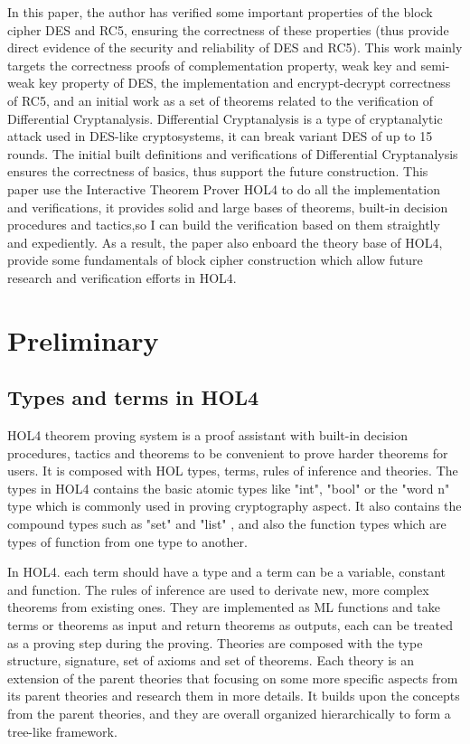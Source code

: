 \documentclass{article}
\begin{document}
In this paper, the author has verified some important properties
of the block cipher DES and RC5, ensuring the correctness of these
properties (thus provide
direct evidence of the security and reliability of DES and RC5).
This work mainly targets the correctness proofs of complementation property,
weak key and semi-weak key property of DES, the implementation and
encrypt-decrypt correctness of RC5, and an initial work as a set of
theorems related to the verification
of Differential Cryptanalysis. Differential Cryptanalysis is a type of cryptanalytic attack used in DES-like
cryptosystems, it can break variant DES of up to 15 rounds. The initial built definitions and verifications of
Differential Cryptanalysis ensures the correctness of basics, thus support the future construction. This paper
use the Interactive Theorem Prover HOL4 to do all the implementation and verifications, it provides solid and
large bases of theorems, built-in decision procedures and tactics,so I can build the verification based on them
straightly and expediently. As a result, the paper also enboard the theory base of HOL4, provide some
fundamentals of block cipher construction which allow future research and verification efforts in HOL4.

\section{Preliminary}

\subsection{Types and terms in HOL4}
HOL4 theorem proving system is a proof assistant with built-in decision procedures, tactics and theorems to
be convenient to prove harder theorems for users. It is composed with HOL types, terms, rules of inference
and theories. The types in HOL4 contains the basic atomic types like "int", "bool" or the "word n" type which
is commonly used in proving cryptography aspect. It also contains the compound types such as "set" and "list"
, and also the function types which are types of function from one type to another.

In HOL4. each term should
have a type and a term can be a variable, constant and function. The rules of inference are used to derivate
new, more complex theorems from existing ones. They are implemented as ML functions and take terms or theorems
as input and return theorems as outputs, each can be treated as a proving step during the proving. Theories are
composed with the type structure, signature, set of axioms and set of theorems. Each theory is an extension of
the parent theories that focusing on some more specific aspects from its parent theories and research them in
more details. It builds upon the concepts from the parent theories, and they are overall organized hierarchically
to form a tree-like framework.
\end{document}
